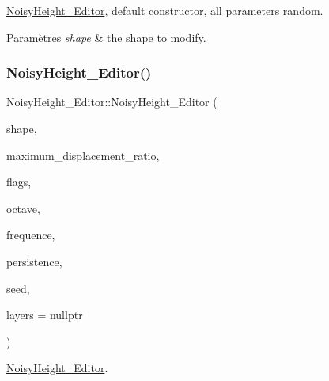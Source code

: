 \hyperlink{class_noisy_height___editor}{Noisy\+Height\+\_\+\+Editor}, default constructor, all parameters random. 


\begin{DoxyParams}{Paramètres}
{\em shape} & the shape to modify. \\
\hline
\end{DoxyParams}
\mbox{\label{class_noisy_height___editor_ac56426a50e5adf94c8b2a4211d0b0c77}} 
\subsubsection{\texorpdfstring{Noisy\+Height\+\_\+\+Editor()}{NoisyHeight\_Editor()}\hspace{0.1cm}{\footnotesize\ttfamily [2/2]}}
{\footnotesize\ttfamily Noisy\+Height\+\_\+\+Editor\+::\+Noisy\+Height\+\_\+\+Editor (\begin{DoxyParamCaption}\item[{\hyperlink{class_shape}{Shape} $\ast$}]{shape,  }\item[{double}]{maximum\+\_\+displacement\+\_\+ratio,  }\item[{\hyperlink{aleatorymode_8h_a8dc9582d5186e7d1ba17c0f21779d3d6}{Mode\+\_\+\+Aleatory\+\_\+\+Flags}}]{flags,  }\item[{int}]{octave,  }\item[{double}]{frequence,  }\item[{double}]{persistence,  }\item[{int}]{seed,  }\item[{\hyperlink{thresholdtable_8h_ab0deb49d07758f9814993774cb9935cc}{Color\+Threshold\+Table} $\ast$}]{layers = {\ttfamily nullptr} }\end{DoxyParamCaption})}



\hyperlink{class_noisy_height___editor}{Noisy\+Height\+\_\+\+Editor}. 


